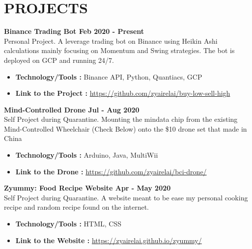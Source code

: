 \section{PROJECTS}

\textbf{Binance Trading Bot \hfill Feb 2020 - Present} \vspace{0.1cm} \\
    Personal Project. A leverage trading bot on Binance using Heikin Ashi calculations mainly focusing on Momentum and Swing strategies. The bot is deployed on GCP and running 24/7. \vspace{0.2cm}
    \begin{itemize}
        \item \textbf{Technology/Tools :} Binance API, Python, Quantiacs, GCP
        \item \textbf{Link to the Project :} \url{https://github.com/zyairelai/buy-low-sell-high}
    \end{itemize}

\textbf{Mind-Controlled Drone \hfill Jul - Aug 2020} \vspace{0.1cm} \\
    Self Project during Quarantine. Mounting the mindata chip from the existing Mind-Controlled Wheelchair (Check Below) onto the \$10 drone set that made in China \vspace{0.2cm}
    \begin{itemize}
        \item \textbf{Technology/Tools :} Arduino, Java, MultiWii
        \item \textbf{Link to the Drone :} \url{https://github.com/zyairelai/bci-drone/}
    \end{itemize}
    
\textbf{Zyummy: Food Recipe Website \hfill Apr - May 2020} \vspace{0.1cm} \\
    Self Project during Quarantine. A website meant to be ease my personal cooking recipe and random recipe found on the internet.  \vspace{0.2cm}
    \begin{itemize}
        \item \textbf{Technology/Tools :} HTML, CSS
        \item \textbf{Link to the Website :} \url{https://zyairelai.github.io/zyummy/}
    \end{itemize}

